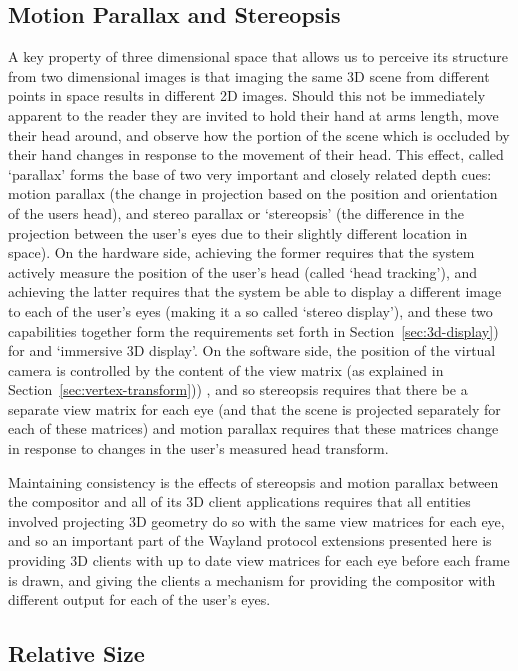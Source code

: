 \subsection{Motion Parallax and Stereopsis}
\label{sec:motion-parallax-and-stereopsis}

A key property of three dimensional space that allows us to perceive its structure from two dimensional images is that imaging the same 3D scene from different points in space results in different 2D images. Should this not be immediately apparent to the reader they are invited to hold their hand at arms length, move their head around, and observe how the portion of the scene which is occluded by their hand changes in response to the movement of their head. This effect, called ‘parallax' forms the base of two very important and closely related depth cues: motion parallax (the change in projection based on the position and orientation of the users head), and stereo parallax or ‘stereopsis' (the difference in the projection between the user's eyes due to their slightly different location in space). On the hardware side, achieving the former requires that the system actively measure the position of the user's head (called ‘head tracking'), and achieving the latter requires that the system be able to display a different image to each of the user's eyes (making it a so called ‘stereo display'), and these two capabilities together form the requirements set forth in Section~\ref{sec:3d-display}) for and ‘immersive 3D display'. On the software side, the position of the virtual camera is controlled by the content of the view matrix (as explained in Section~\ref{sec:vertex-transform})) , and so stereopsis requires that there be a separate view matrix for each eye (and that the scene is projected separately for each of these matrices) and motion parallax requires that these matrices change in response to changes in the user's measured head transform.

Maintaining consistency is the effects of stereopsis and motion parallax between the compositor and all of its 3D client applications requires that all entities involved projecting 3D geometry do so with the same view matrices for each eye, and so an important part of the Wayland protocol extensions presented here is providing 3D clients with up to date view matrices for each eye before each frame is drawn, and giving the clients a mechanism for providing the compositor with different output for each of the user's eyes.

\subsection{Relative Size}

